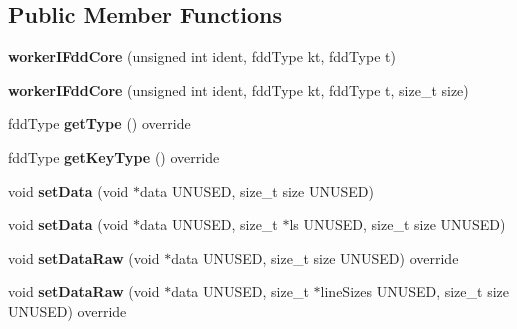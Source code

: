 \subsection*{Public Member Functions}
\begin{DoxyCompactItemize}
\item 
\hypertarget{classfaster_1_1workerIFddCore_a4870d516ed4bef37adc17746b74ec267}{}{\bfseries worker\+I\+Fdd\+Core} (unsigned int ident, fdd\+Type kt, fdd\+Type t)\label{classfaster_1_1workerIFddCore_a4870d516ed4bef37adc17746b74ec267}

\item 
\hypertarget{classfaster_1_1workerIFddCore_a5e7e471ccfa11ee3e3b5a287d6512f2f}{}{\bfseries worker\+I\+Fdd\+Core} (unsigned int ident, fdd\+Type kt, fdd\+Type t, size\+\_\+t size)\label{classfaster_1_1workerIFddCore_a5e7e471ccfa11ee3e3b5a287d6512f2f}

\item 
\hypertarget{classfaster_1_1workerIFddCore_af389368c2a1761b958c8e08336864b92}{}fdd\+Type {\bfseries get\+Type} () override\label{classfaster_1_1workerIFddCore_af389368c2a1761b958c8e08336864b92}

\item 
\hypertarget{classfaster_1_1workerIFddCore_a5db1be64cd268995e0ca456b5407510d}{}fdd\+Type {\bfseries get\+Key\+Type} () override\label{classfaster_1_1workerIFddCore_a5db1be64cd268995e0ca456b5407510d}

\item 
\hypertarget{classfaster_1_1workerIFddCore_a3effbc1108e2778555e63f655cdac4d9}{}void {\bfseries set\+Data} (void $\ast$data U\+N\+U\+S\+E\+D, size\+\_\+t size U\+N\+U\+S\+E\+D)\label{classfaster_1_1workerIFddCore_a3effbc1108e2778555e63f655cdac4d9}

\item 
\hypertarget{classfaster_1_1workerIFddCore_a1fda790a0244ace7fbf02f5d291eae1c}{}void {\bfseries set\+Data} (void $\ast$data U\+N\+U\+S\+E\+D, size\+\_\+t $\ast$ls U\+N\+U\+S\+E\+D, size\+\_\+t size U\+N\+U\+S\+E\+D)\label{classfaster_1_1workerIFddCore_a1fda790a0244ace7fbf02f5d291eae1c}

\item 
\hypertarget{classfaster_1_1workerIFddCore_ae8c350a472d39e564e1b5a9ebfdf0500}{}void {\bfseries set\+Data\+Raw} (void $\ast$data U\+N\+U\+S\+E\+D, size\+\_\+t size U\+N\+U\+S\+E\+D) override\label{classfaster_1_1workerIFddCore_ae8c350a472d39e564e1b5a9ebfdf0500}

\item 
\hypertarget{classfaster_1_1workerIFddCore_a4ef9b26a6d008c213b8fb0447aaed235}{}void {\bfseries set\+Data\+Raw} (void $\ast$data U\+N\+U\+S\+E\+D, size\+\_\+t $\ast$line\+Sizes U\+N\+U\+S\+E\+D, size\+\_\+t size U\+N\+U\+S\+E\+D) override\label{classfaster_1_1workerIFddCore_a4ef9b26a6d008c213b8fb0447aaed235}


\end{DoxyCompactItemize}
